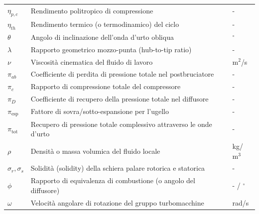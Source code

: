 \begin{longtable}{p{} p{} p{}}
    $\eta_{p,c}$ & Rendimento politropico di compressione & - \\[2px]
    $\eta_{th}$ & Rendimento termico (o termodinamico) del ciclo & - \\[2px]
    $\theta$ & Angolo di inclinazione dell'onda d'urto obliqua & $^\circ$ \\[2px]
    $\lambda$ & Rapporto geometrico mozzo-punta (hub-to-tip ratio) & - \\[2px]
    $\nu$ & Viscosità cinematica del fluido di lavoro & $\text{m}^2$/s \\[2px]
    $\pi_{ab}$ & Coefficiente di perdita di pressione totale nel postbruciatore & - \\[2px]
    $\pi_c$ & Rapporto di compressione totale del compressore & - \\[2px]
    $\pi_D$ & Coefficiente di recupero della pressione totale nel diffusore & - \\[2px]
    $\pi_{\text{esp}}$ & Fattore di sovra/sotto-espansione per l'ugello & - \\[2px]
    $\pi_{\text{tot}}$ & Recupero di pressione totale complessivo attraverso le onde d'urto & - \\[2px]
    $\rho$ & Densità o massa volumica del fluido locale & kg/$\text{m}^3$ \\[2px]
    $\sigma_r, \sigma_s$ & Solidità (solidity) della schiera palare rotorica e statorica & - \\[2px]
    $\phi$ & Rapporto di equivalenza di combustione (o angolo del diffusore) & - / $^\circ$ \\[2px]
    $\omega$ & Velocità angolare di rotazione del gruppo turbomacchine & rad/s \\[2px]
\end{longtable}



